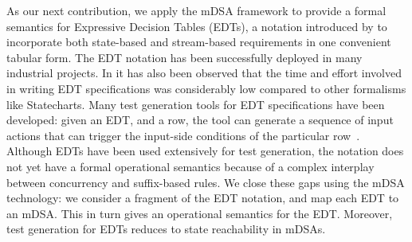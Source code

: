 \documentclass[runningheads,envcountsame]{llncs}
\begin{document}
  As our next contribution, we apply the mDSA framework to provide a formal semantics for Expressive Decision Tables (EDTs), a notation introduced by \cite{DBLP:conf/date/VenkateshSKA14} to incorporate both state-based and stream-based requirements in one convenient tabular form. The EDT notation has been successfully deployed in many industrial projects. In \cite{DBLP:conf/date/VenkateshSKA14} it has also been observed that the time and effort involved in writing EDT specifications was considerably low compared to other formalisms like  Statecharts. Many test generation tools for EDT specifications have been developed: given an EDT, and a row, the tool can generate a sequence of input actions that can trigger the input-side conditions of the particular row~\cite{DBLP:conf/enase/VenkateshSZA15a,DBLP:conf/icst/AgrawalVSZV20}. %
  Although EDTs have been used extensively for test generation, the notation does not yet have a formal operational semantics because of a complex interplay between concurrency and suffix-based rules. We close these gaps using the mDSA technology: we consider a fragment of the EDT notation, and map each EDT to an mDSA. This in turn gives an operational semantics for the EDT. Moreover, test generation for EDTs reduces to state reachability in mDSAs. 
  
  
  
  

  

  
  



\end{document}
